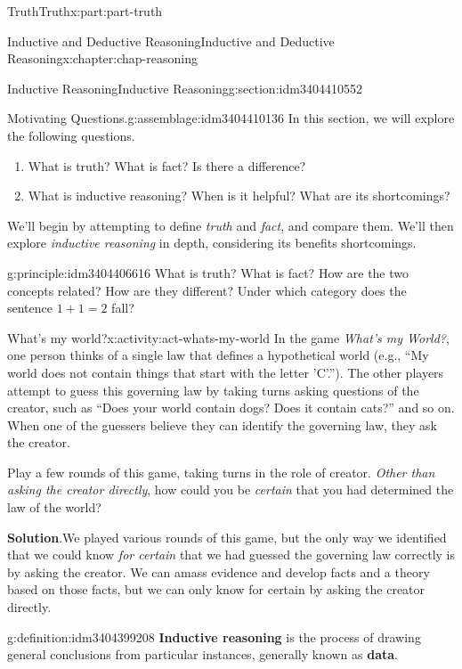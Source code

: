 \documentclass[oneside,10pt,]{book}
\newcommand{\blocktitlefont}{\relax}
\newcommand{\terminology}[1]{\textbf{#1}}
\numberwithin{equation}{section}
\begin{document}
\begin{partptx}{Truth}{}{Truth}{}{}{x:part:part-truth}
\begin{chapterptx}{Inductive and Deductive Reasoning}{}{Inductive and Deductive Reasoning}{}{}{x:chapter:chap-reasoning}
\begin{sectionptx}{Inductive Reasoning}{}{Inductive Reasoning}{}{}{g:section:idm3404410552}
\begin{assemblage}{Motivating Questions.}{g:assemblage:idm3404410136}
In this section, we will explore the following questions. %
\begin{enumerate}
\item{}What is truth? What is fact? Is there a difference?%
\item{}What is inductive reasoning? When is it helpful? What are its shortcomings?%
\end{enumerate}
%
\end{assemblage}
We'll begin by attempting to define \emph{truth} and \emph{fact}, and compare them. We'll then explore \emph{inductive reasoning} in depth, considering its benefits shortcomings.%
\begin{principle}{}{}{g:principle:idm3404406616}%
What is truth? What is fact? How are the two concepts related? How are they different? Under which category does the sentence \(1+1=2\) fall?%
\end{principle}
\begin{activity}{What's my world?}{x:activity:act-whats-my-world}%
In the game \emph{What's my World?}, one person thinks of a single law that defines a hypothetical world (e.g., ``My world does not contain things that start with the letter 'C'.''). The other players attempt to guess this governing law by taking turns asking questions of the creator, such as ``Does your world contain dogs? Does it contain cats?'' and so on. When one of the guessers believe they can identify the governing law, they ask the creator.%
\par
Play a few rounds of this game, taking turns in the role of creator. \emph{Other than asking the creator directly}, how could you be \emph{certain} that you had determined the law of the world?%
\par\smallskip%
\noindent\textbf{\blocktitlefont Solution}.\hypertarget{g:solution:idm3404400472}{}\quad{}We played various rounds of this game, but the only way we identified that we could know \emph{for certain} that we had guessed the governing law correctly is by asking the creator. We can amass evidence and develop facts and a theory based on those facts, but we can only know for certain by asking the creator directly.%
\end{activity}%
\begin{definition}{}{g:definition:idm3404399208}%
%
\terminology{Inductive reasoning} is the process of drawing general conclusions from particular instances, generally known as \terminology{data}.%
\end{definition}

\end{sectionptx}
\end{chapterptx}
\end{partptx}
\end{document}
